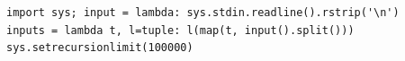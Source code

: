 \begin{verbatim}
import sys; input = lambda: sys.stdin.readline().rstrip('\n')
inputs = lambda t, l=tuple: l(map(t, input().split()))
sys.setrecursionlimit(100000)
\end{verbatim}